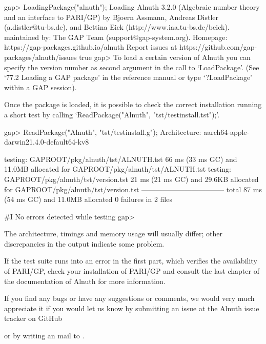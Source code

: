 \beginexample
    gap> LoadingPackage("alnuth");
    Loading  Alnuth 3.2.0 (Algebraic number theory and an interface to PARI/GP)
    by Bjoern Assmann,
       Andreas Distler (a.distler@tu-bs.de), and
       Bettina Eick (http://www.iaa.tu-bs.de/beick).
    maintained by:
       The GAP Team (support@gap-system.org).
    Homepage: https://gap-packages.github.io/alnuth
    Report issues at https://github.com/gap-packages/alnuth/issues
    true
    gap>
\endexample
To load a certain version of Alnuth you can specify the version number as
second argument in the call to `LoadPackage'. (See `77.2 Loading a GAP
package' in the reference manual or type `?LoadPackage' within a GAP session).

Once the package is loaded, it is possible to check the correct installation
running a short test by calling `ReadPackage("Alnuth",
"tst/testinstall.tst");'.

\beginexample
    gap> ReadPackage("Alnuth", "tst/testinstall.g");
    Architecture: aarch64-apple-darwin21.4.0-default64-kv8

    testing: GAPROOT/pkg/alnuth/tst/ALNUTH.tst
          66 ms (33 ms GC) and 11.0MB allocated for GAPROOT/pkg/alnuth/tst/ALNUTH.tst
    testing: GAPROOT/pkg/alnuth/tst/version.tst
          21 ms (21 ms GC) and 29.6KB allocated for GAPROOT/pkg/alnuth/tst/version.tst
    -----------------------------------
    total        87 ms (54 ms GC) and 11.0MB allocated
                  0 failures in 2 files

    #I  No errors detected while testing
    gap>
\endexample

The architecture, timings and memory usage will usually differ; other
discrepancies in the output indicate some problem.

If the test suite runs into an error in the first part, which verifies the
availability of PARI/GP, check your installation of PARI/GP and consult the
last chapter of the documentation of Alnuth for more information.

If you find any bugs or have any suggestions or comments, we would very much
appreciate it if you would let us know by submitting an issue at the Alnuth
issue tracker on GitHub 

or by writing an mail to .
